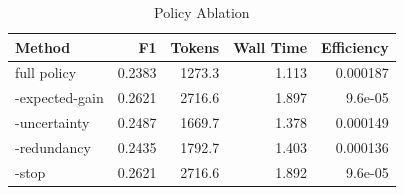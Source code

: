 \begin{table}[t]
\centering
\small
\caption{Policy Ablation}
\begin{tabular}{lrrrr}
\hline
Method & F1 & Tokens & Wall Time & Efficiency \\
\hline
full policy & 0.2383 & 1273.3 & 1.113 & 0.000187 \\
-expected-gain & 0.2621 & 2716.6 & 1.897 & 9.6e-05 \\
-uncertainty & 0.2487 & 1669.7 & 1.378 & 0.000149 \\
-redundancy & 0.2435 & 1792.7 & 1.403 & 0.000136 \\
-stop & 0.2621 & 2716.6 & 1.892 & 9.6e-05 \\
\hline
\end{tabular}
\end{table}
